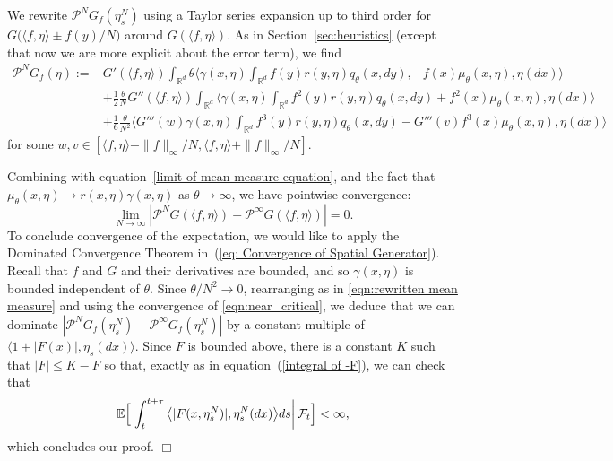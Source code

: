 \documentclass[12pt]{article}
\newenvironment {proof}{{\noindent\bf Proof }}{\hfill $\Box$ \medskip}
\newcommand{\IE}{\mathbb E}
\newcommand{\IR}{\mathbb R}
\newcommand{\Pgen}{\mathcal{P}}    %
\numberwithin{equation}{section}
\begin{document}
\begin{proof}
We rewrite $\Pgen^NG_f(\eta^N_s)$ using a 
Taylor series expansion up to third order for
$G\big(\langle f,\eta\rangle\pm f(y)/N\big)$ around
$G(\langle f, \eta \rangle )$.
As in Section~\ref{sec:heuristics} (except that now we are more explicit about
the error term), we find
\begin{equation} 
    \label{eq: Pre-Limit Generator Expanded}
\begin{aligned}
\Pgen^{N} G_f(\eta)
    :=& 
    G'(\langle f, \eta \rangle)\int_{\IR^d}  
\theta\Big\langle \gamma(x,\eta) \int_{\IR^d} f(y)r(y,\eta) q_{\theta}(x,dy), 
    - f(x)\mu_\theta(x,\eta), \eta(dx)\Big\rangle\\
&+\frac{1}{2}\frac{\theta}{N}G''(\langle f, \eta \rangle)\int_{\IR^d} 
 \Big\langle\gamma(x, \eta)\int_{\IR^d} f^2(y) r(y,\eta)q_{\theta}(x,dy)+f^2(x)
\mu_\theta(x, \eta), \eta(dx)\Big\rangle\\
&+\frac{1}{6}\frac{\theta}{N^2}\Big\langle
G'''(w) \gamma(x, \eta)\int_{\IR^d} f^3(y) r(y,\eta) 
q_{\theta}(x,dy)
-G'''(v)f^3(x)\mu_\theta(x, \eta), \eta(dx)\Big\rangle
\end{aligned}    
\end{equation}
for some $w,v \in [\langle f,\eta \rangle - \|f\|_\infty/N, 
\langle f,\eta \rangle + \|f\|_\infty/N]$.

Combining with equation~\eqref{limit of mean measure equation}, and the fact
that $\mu_\theta(x,\eta) \to r(x,\eta)\gamma(x,\eta)$ as $\theta\to\infty$, we have
pointwise convergence:
\begin{equation}
\lim_{N\to \infty} |\mathcal{P}^{N}G(\langle f, \eta \rangle) 
- \mathcal{P}^{\infty}G(\langle f, \eta \rangle)| = 0 .
\end{equation}
To conclude convergence of the expectation, 
we would like to apply the Dominated Convergence 
Theorem in~(\ref{eq: Convergence of Spatial Generator}).
Recall that $f$ and $G$ and their derivatives are bounded,
and so $\gamma(x,\eta)$ is bounded independent of $\theta$.
Since $\theta/N^2 \to 0$,
rearranging as in \eqref{eqn:rewritten mean measure}
and using the convergence of \eqref{eqn:near_critical},
we deduce that we can dominate
$\left| \Pgen^{N}G_f(\eta^{N}_s) -\Pgen^{\infty}G_f(\eta^{N}_s) \right|$
by a constant multiple of $\langle 1+|F(x)|,\eta_s(dx)\rangle$.
Since $F$ is bounded above, there is a constant $K$ such that $|F|\leq K-F$ so
that, exactly as in equation~(\ref{integral of -F}), 
we can check that
\[
\IE\Big[\left.\int_t^{t+\tau}\big\langle |F(x,\eta^N_s)|,\eta^N_s(dx)\big\rangle ds
\right| {\cal F}_t\Big]<\infty,
\]
which concludes our proof.
\end{proof}
\end{document}
